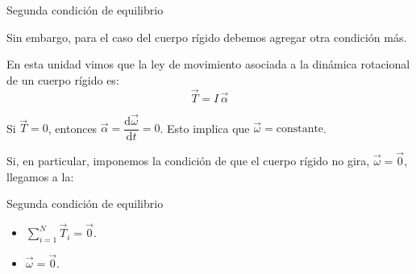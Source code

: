 \documentclass[11pt,handout,aspectratio=1610]{beamer}
\newcommand{\fdiff}[2]{\dfrac{\text{d} #1}{\text{d} #2}}
\newcommand{\vs}{\vspace{11pt}}
\begin{document}
\begin{frame}{Segunda condición de equilibrio}

    Sin embargo, para el caso del cuerpo rígido debemos agregar otra condición más.

    \vs

    En esta unidad vimos que la ley de movimiento asociada a la dinámica rotacional de un cuerpo rígido es: $$\vec{T} = I \, \vec{\alpha}$$

        

Si $\vec{T} = 0$, entonces $\vec{\alpha} = \fdiff{\vec{\omega}}{t} = 0$. Esto implica que $\vec{\omega} = \mbox{constante}$.

\vs

Si, en particular, imponemos la condición de que el cuerpo rígido no gira, $\vec{\omega} = \vec{0}$, llegamos a la:
    \begin{block}{Segunda condición de equilibrio}
        \begin{itemize}
            \item $\sum\limits_{i=1}^N \vec{T}_i = \vec{0}$.
            \item $\vec{\omega} = \vec{0}$.
        \end{itemize}
    \end{block}
    
\end{frame}
\end{document}
